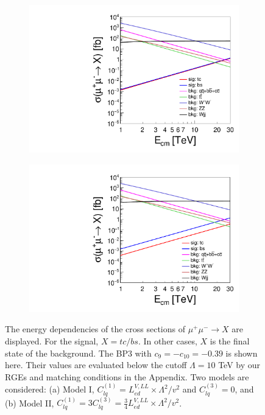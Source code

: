 \documentclass[a4paper,11pt]{article}
\begin{document}
\begin{figure}
  \centering
  \captionsetup[sub]{font=large}
  \begin{subfigure}[t]{0.45\textwidth}
     \includegraphics[width=\linewidth]{e_sigma_clq1_only_log.pdf}
     \caption{}
  \end{subfigure}
  \begin{subfigure}[t]{0.45\textwidth}
     \includegraphics[width=\linewidth]{e_sigma_clq1_eq_3clq3_log.pdf}
     \caption{}
  \end{subfigure}
  \caption{The energy dependencies of the cross sections of $\mu^+\mu^-\to X$ are displayed. For the signal, $X=tc/bs$. In other cases, $X$ is the final state of the background. The BP3 with $c_{9}=-c_{10}=-0.39$ is shown here. Their values are evaluated below the cutoff $\Lambda=10$ TeV by our RGEs and matching conditions in the Appendix. Two models are considered: (a) Model I, $C^{(1)}_{lq}=L^{V,LL}_{ed}\times \Lambda^2/v^2$ and $C^{(3)}_{lq}=0$,  and (b) Model II, $C^{(1)}_{lq}=3C^{(3)}_{lq}=\frac{3}{4}L^{V,LL}_{ed}\times \Lambda^2/v^2$.\label{ecm}}
\end{figure}
\end{document}
